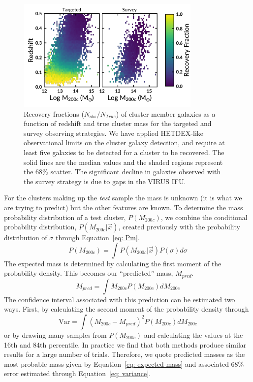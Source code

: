 \documentclass[fleqn,usenatbib]{mnras}
\begin{document}
\begin{figure}
	\includegraphics[width=0.8\textwidth]{figures/recovery.pdf} 
	\caption{Recovery fractions ($N_{obs}/N_{True}$) of cluster member galaxies as a function of redshift and true cluster mass for the targeted and survey observing strategies. We have applied HETDEX-like observational limits on the cluster galaxy detection, and require at least five galaxies to be detected for a cluster to be recovered. The solid lines are the median values and the shaded regions represent the 68\% scatter. The significant decline in galaxies observed with the survey strategy is due to gaps in the VIRUS IFU.} \label{fig: recovery} 
\end{figure}

For the clusters making up the \emph{test} sample the mass is unknown (it is what we are trying to predict) but the other features are known. To determine the mass probability distribution of a test cluster, $P(M_{200c})$, we combine the conditional probability distribution, $P(M_{200c}|\vec{x})$, created previously with the probability distribution of $\sigma$ through Equation~\ref{eq: Pm}.
\begin{equation}\label{eq: Pm}
	P(M_{200c}) = \int P(M_{200c}|\vec{x}) P(\sigma) d\sigma
\end{equation}
The expected mass is determined by calculating the first moment of the probability density. This becomes our ``predicted'' mass, $M_{pred}$.
\begin{equation}\label{eq: expected mass}
	M_{pred}= \int M_{200c} P(M_{200c})dM_{200c}
\end{equation}
The confidence interval associated with this prediction can be estimated two ways. First, by calculating the second moment of the probability density through
\begin{equation}\label{eq: variance}
	\mathrm{Var} = \int (M_{200c} - M_{pred})^2 P(M_{200c})dM_{200c}
\end{equation}
or by drawing many samples from $P(M_{200c})$ and calculating the values at the 16th and 84th percentile. In practice we find that both methods produce similar results for a large number of trials. Therefore, we quote predicted masses as the most probable mass given by Equation~\ref{eq: expected mass} and associated 68\% error estimated through Equation~\ref{eq: variance}.
\end{document}

